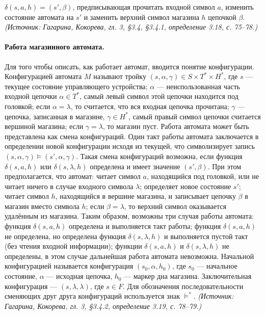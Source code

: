 \documentclass[a4paper,12pt]{article}
\begin{document}
\(\delta(s,a,h)=(s',\beta)\), предписывающая прочитать входной символ \(a\), изменить состояние автомата на \(s'\) и заменить верхний символ магазина \(h\) цепочкой \(\beta\).
\textit{(Источник: Гагарина, Кокорева, гл. 3, §3.4, §3.4.1, определение 3.18, с. 75--78.)}

\paragraph{Работа магазинного автомата.}
Для того чтобы описать, как работает автомат, вводится понятие конфигурации. Конфигурацией автомата \(M\) называют тройку \((s,\alpha,\gamma)\in S\times T^*\times H^*\), где \(s\) — текущее состояние управляющего устройства; \(\alpha\) — неиспользованная часть входной цепочки \(\alpha\in T^*\), самый левый символ этой цепочки находится под головкой; если \(\alpha=\lambda\), то считается, что вся входная цепочка прочитана; \(\gamma\) — цепочка, записанная в магазине, \(\gamma\in H^*\), самый правый символ цепочки считается вершиной магазина; если \(\gamma=\lambda\), то магазин пуст. Работа автомата может быть представлена как смена конфигураций. Один такт работы автомата заключается в определении новой конфигурации исходя из текущей, что символизирует запись \((s,\alpha,\gamma)\models(s',\alpha,\gamma)\). Такая смена конфигураций возможна, если функция \(\delta(s,a,h)\) или \(\delta(s,\lambda,h)\) определена и имеет значение \((s',\beta)\). При этом предполагается, что автомат: читает символ \(a\), находящийся под головкой, или не читает ничего в случае входного символа \(\lambda\); определяет новое состояние \(s'\); читает символ \(h\), находящийся в вершине магазина, и записывает цепочку \(\beta\) в магазин вместо символа \(h\); если \(\beta=\lambda\), то верхний символ оказывается удалённым из магазина. Таким образом, возможны три случая работы автомата: функция \(\delta(s,a,h)\) определена и выполняется такт работы; функция \(\delta(s,a,h)\) не определена, но определена функция \(\delta(s,\lambda,h)\) и выполняется пустой такт (без чтения входной информации); функции \(\delta(s,a,h)\) и \(\delta(s,\lambda,h)\) не определены, в этом случае дальнейшая работа автомата невозможна. Начальной конфигурацией называется конфигурация \((s_0,\alpha,h_0)\), где \(s_0\) — начальное состояние, \(\alpha\) — исходная цепочка, \(h_0\) — маркер дна магазина. Заключительная конфигурация — \((s,\lambda,\lambda)\), где \(s\in F\). Для обозначения последовательности сменяющих друг друга конфигураций используется знак \(\models^*\).
\textit{(Источник: Гагарина, Кокорева, гл. 3, §3.4.2, определение 3.19, с. 78--79.)}
\end{document}
